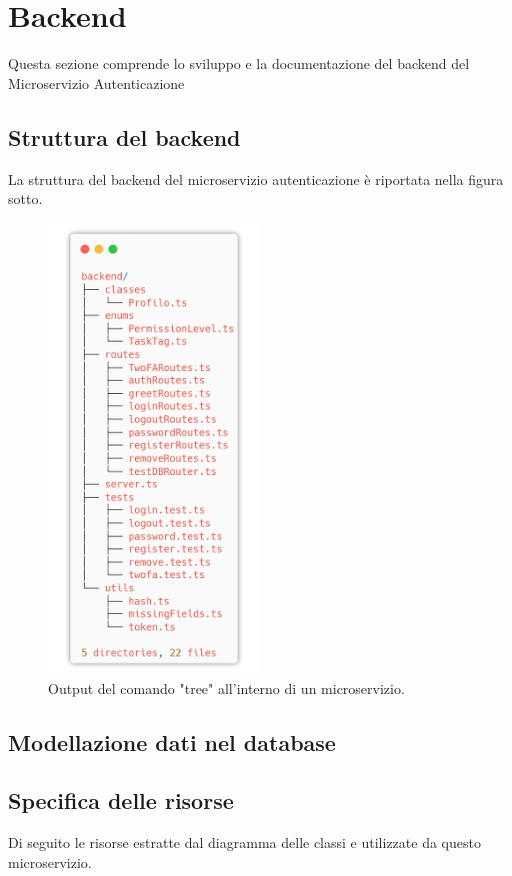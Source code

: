 \documentclass{report}
\begin{document}
\section{Backend}

Questa sezione comprende lo sviluppo e la documentazione del backend del Microservizio Autenticazione

\subsection{Struttura del backend}
La struttura del backend del microservizio autenticazione è riportata
nella figura sotto. 
\begin{figure}[H]
	\centering\includegraphics[width=0.5\textwidth]{images/microservizio-autenticazione/backend-structure.png}
	\caption{Output del comando "tree" all'interno di un microservizio.}
\end{figure}

\subsection{Modellazione dati nel database}



\subsection{Specifica delle risorse}
Di seguito le risorse estratte dal diagramma delle classi e utilizzate da questo microservizio.
\end{document}
